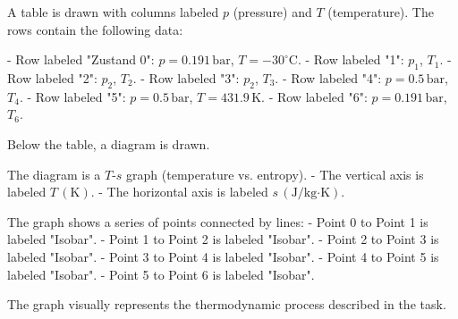 A table is drawn with columns labeled \( p \) (pressure) and \( T \) (temperature). The rows contain the following data:  

- Row labeled "Zustand 0": \( p = 0.191 \, \text{bar} \), \( T = -30^\circ \text{C} \).  
- Row labeled "1": \( p_1 \), \( T_1 \).  
- Row labeled "2": \( p_2 \), \( T_2 \).  
- Row labeled "3": \( p_2 \), \( T_3 \).  
- Row labeled "4": \( p = 0.5 \, \text{bar} \), \( T_4 \).  
- Row labeled "5": \( p = 0.5 \, \text{bar} \), \( T = 431.9 \, \text{K} \).  
- Row labeled "6": \( p = 0.191 \, \text{bar} \), \( T_6 \).  

Below the table, a diagram is drawn.  

The diagram is a \( T \)-\( s \) graph (temperature vs. entropy).  
- The vertical axis is labeled \( T \, (\text{K}) \).  
- The horizontal axis is labeled \( s \, (\text{J/kg·K}) \).  

The graph shows a series of points connected by lines:  
- Point 0 to Point 1 is labeled "Isobar".  
- Point 1 to Point 2 is labeled "Isobar".  
- Point 2 to Point 3 is labeled "Isobar".  
- Point 3 to Point 4 is labeled "Isobar".  
- Point 4 to Point 5 is labeled "Isobar".  
- Point 5 to Point 6 is labeled "Isobar".  

The graph visually represents the thermodynamic process described in the task.